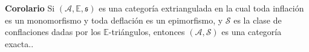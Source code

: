 \documentclass[preview]{standalone}
\begin{document}
\begin{center}
\justifying \textbf{Corolario} Si $(\mathscr{A}, \mathbb{E}, \mathfrak{s})$ es una categoría extriangulada en la cual toda inflación es un monomorfismo y toda deflación es un epimorfismo, y $\mathscr{S}$ es la clase de conflaciones dadas por los $\mathbb{E}$-triángulos, entonces $(\mathscr{A}, \mathscr{S})$ es una categoría exacta..
\end{center}
\end{document}
